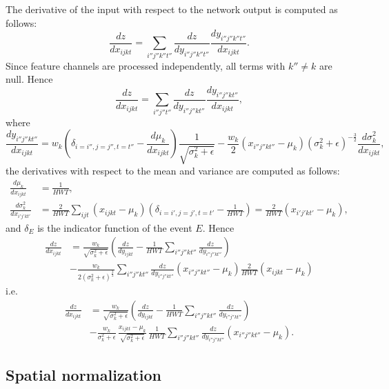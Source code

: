 The derivative of the input with respect to the network output is computed as follows:
\[
\frac{dz}{dx_{ijkt}} = \sum_{i''j''k''t''}
\frac{dz}{d y_{i''j''k''t''}} 
\frac{d y_{i''j''k''t''}}{d x_{ijkt}}.
\]
Since feature channels are processed independently, all terms with $k''\not=k$ are null. Hence
\[
\frac{dz}{dx_{ijkt}} = \sum_{i''j''t''}
\frac{dz}{d y_{i''j''kt''}} 
\frac{d y_{i''j''kt''}}{d x_{ijkt}},
\]
where
\[
\frac{d y_{i''j''kt''}}{d x_{ijkt}} 
=
w_k
\left(\delta_{i=i'',j=j'',t=t''} - \frac{d \mu_k}{d x_{ijkt}}\right)
\frac{1}{\sqrt{\sigma^2_k + \epsilon}}
-
\frac{w_k}{2}
\left(x_{i''j''kt''} - \mu_k\right)
\left(\sigma_k^2 + \epsilon \right)^{-\frac{3}{2}}
\frac{d \sigma_k^2}{d x_{ijkt}},
\]
the derivatives with respect to the mean and variance are computed as follows:
\begin{align*}
\frac{d \mu_k}{d x_{ijkt}} &= \frac{1}{HWT},
\\
\frac{d \sigma_k^2}{d x_{i'j'kt'}}
&=
\frac{2}{HWT}
\sum_{ijt}
\left(x_{ijkt} - \mu_k \right)
\left(\delta_{i=i',j=j',t=t'} - \frac{1}{HWT} \right)
=
\frac{2}{HWT} \left(x_{i'j'kt'} - \mu_k \right),
\end{align*}
and $\delta_E$ is the indicator function of the event $E$. Hence
\begin{align*}
\frac{dz}{dx_{ijkt}}
&=
\frac{w_k}{\sqrt{\sigma^2_k + \epsilon}}
\left(
\frac{dz}{d y_{ijkt}} 
-
\frac{1}{HWT}\sum_{i''j''kt''}
\frac{dz}{d y_{i''j''kt''}} 
\right)
\\
&-
\frac{w_k}{2(\sigma^2_k + \epsilon)^{\frac{3}{2}}}
\sum_{i''j''kt''}
\frac{dz}{d y_{i''j''kt''}} 
\left(x_{i''j''kt''} - \mu_k\right)
\frac{2}{HWT} \left(x_{ijkt} - \mu_k \right)
\end{align*}
i.e.
\begin{align*}
\frac{dz}{dx_{ijkt}}
&=
\frac{w_k}{\sqrt{\sigma^2_k + \epsilon}}
\left(
\frac{dz}{d y_{ijkt}} 
-
\frac{1}{HWT}\sum_{i''j''kt''}
\frac{dz}{d y_{i''j''kt''}} 
\right)
\\
&-
\frac{w_k}{\sigma^2_k + \epsilon}
\,
\frac{x_{ijkt} - \mu_k}{\sqrt{\sigma^2_k + \epsilon}}
\,
\frac{1}{HWT}
\sum_{i''j''kt''}
\frac{dz}{d y_{i''j''kt''}} 
\left(x_{i''j''kt''} - \mu_k\right).
\end{align*}

\subsection{Spatial normalization}\label{s:impl-spnorm}

